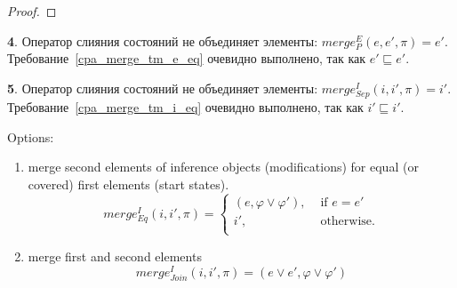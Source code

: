 \begin{proof}


%
%
%
\end{proof}

{\textbf 4.} Оператор слияния состояний не объединяет элементы: $merge^E_{P}(e, e', \pi) = e'$. Требование~\ref{cpa_merge_tm_e_eq} очевидно выполнено, так как $e' \sqsubseteq e'$.

{\textbf 5.} Оператор слияния состояний не объединяет элементы: $merge^I_{Sep}(i, i', \pi) = i'$. 
Требование~\ref{cpa_merge_tm_i_eq} очевидно выполнено, так как $i' \sqsubseteq i'$.

Options: 
\begin{enumerate}
\item merge second elements of inference objects (modifications) for equal (or covered) first elements (start states).
$$merge^I_{Eq}(i, i', \pi)= 
\left\lbrace\begin{array}{ll}
(e, \varphi \lor \varphi'), & \mbox{ if } e = e' \\
i', &\mbox{ otherwise}.\\
\end{array}
\right.$$
\item merge first and second elements
$$merge^I_{Join}(i, i', \pi)= 
(e \lor e', \varphi \lor \varphi')$$
\end{enumerate}

